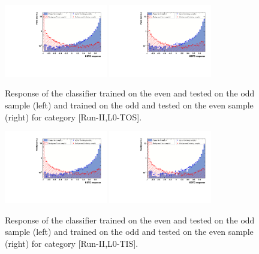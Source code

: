 \begin{figure}[h]
\includegraphics[height=!,width=0.4\textwidth]{figs/TMVA/BDTG_Data_run2_t0_even/overtrain_BDTG.pdf}
\includegraphics[height=!,width=0.4\textwidth]{figs/TMVA/BDTG_Data_run2_t0_odd/overtrain_BDTG.pdf}
\caption{Response of the classifier trained on the even and tested on the odd sample (left) and trained on the odd and tested on the even sample (right) for category [Run-II,\textsf{L0-TOS}].}

\includegraphics[height=!,width=0.4\textwidth]{figs/TMVA/BDTG_Data_run2_t1_even/overtrain_BDTG.pdf}
\includegraphics[height=!,width=0.4\textwidth]{figs/TMVA/BDTG_Data_run2_t1_odd/overtrain_BDTG.pdf}
\caption{Response of the classifier trained on the even and tested on the odd sample (left) and trained on the odd and tested on the even sample (right) for category [Run-II,\textsf{L0-TIS}].}
\end{figure}

